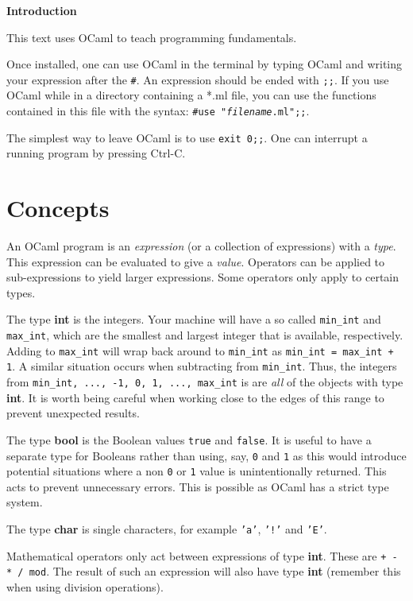 \documentclass[12pt]{article}
\begin{document}
\begin{center}\LARGE\bf
    Introduction
\end{center}

This text uses OCaml to teach programming fundamentals.

Once installed, one can use OCaml in the terminal by typing OCaml and writing your expression
after the \texttt{\#}. An expression should be ended with \texttt{;;}. If you use OCaml while in a
directory containing a *.ml file, you can use the functions contained in this file with the syntax:
\texttt{\#use "\textit{filename}.ml";;}.

The simplest way to leave OCaml is to use \texttt{exit 0;;}. One can interrupt a running program by
pressing Ctrl-C.

\section{Concepts}
An OCaml program is an \textit{expression} (or a collection of expressions) with a \textit{type}.
This expression can be evaluated to give a \textit{value}. Operators can be applied to sub-expressions
to yield larger expressions. Some operators only apply to certain types.

The type \textbf{int} is the integers. Your machine will have a so called \texttt{min\_int} and \texttt{max\_int}, which
are the smallest and largest integer that is available, respectively. Adding to \texttt{max\_int} will
wrap back around to \texttt{min\_int} as \texttt{min\_int = max\_int + 1}. A similar situation occurs when
subtracting from \texttt{min\_int}. Thus, the integers from \texttt{min\_int, ..., -1, 0, 1, ..., max\_int} is
are \textit{all} of the objects with type \textbf{int}. It is worth being careful when working close to the edges of this range
to prevent unexpected results.

The type \textbf{bool} is the Boolean values \texttt{true} and \texttt{false}. It is useful to have
a separate type for Booleans rather than using, say, \texttt{0} and \texttt{1} as this would introduce
potential situations where a non \texttt{0} or \texttt{1} value is unintentionally returned. This acts
to prevent unnecessary errors. This is possible as OCaml has a strict type system.

The type \textbf{char} is single characters, for example \texttt{'a'}, \texttt{'!'} and \texttt{'E'}.

Mathematical operators only act between expressions of type \textbf{int}. These are \texttt{+ - * / mod}.
The result of such an expression will also have type \textbf{int} (remember this when using division operations).
\end{document}
